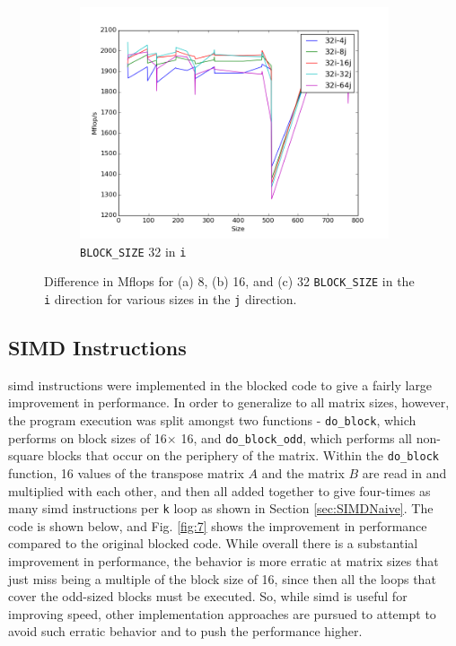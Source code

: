 \documentclass[10pt]{article}
\begin{document}
\begin{figure}[H]
\begin{subfigure}[b]{0.35\textwidth}
        \centering
        \includegraphics[width=\textwidth]{figures/32i-64j.png}
        \caption{{\tt BLOCK\_SIZE} 32 in {\tt i}}
        \end{subfigure}%
        \caption{Difference in Mflops for (a) 8, (b) 16, and (c) 32 {\tt BLOCK\_SIZE} in the {\tt i} direction for various sizes in the {\tt j} direction.}
        \label{fig:5}
\end{figure}

\subsection{SIMD Instructions} 

\gls{simd} instructions were implemented in the blocked code to give a fairly large improvement in performance. In order to generalize to all matrix sizes, however, the program execution was split amongst two functions - {\tt do\_block}, which performs on block sizes of 16\(\times\) 16, and {\tt do\_block\_odd}, which performs all non-square blocks that occur on the periphery of the matrix. Within the {\tt do\_block} function, 16 values of the transpose matrix \(A\) and the matrix \(B\) are read in and multiplied with each other, and then all added together to give four-times as many \gls{simd} instructions per {\tt k} loop as shown in Section \ref{sec:SIMDNaive}. The code is shown below, and Fig. \ref{fig:7} shows the improvement in performance compared to the original blocked code. While overall there is a substantial improvement in performance, the behavior is more erratic at matrix sizes that just miss being a multiple of the block size of 16, since then all the loops that cover the odd-sized blocks must be executed. So, while \gls{simd} is useful for improving speed, other implementation approaches are pursued to attempt to avoid such erratic behavior and to push the performance higher.
\end{document}
